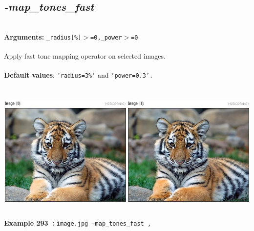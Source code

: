 \documentclass[a4paper,11pt,twoside]{book}
\begin{document}
\subsection{\emph{-map\_tones\_fast} }\vspace*{-0.5em}
~\\\textbf{Arguments: } 
{\small \texttt{\_radius[\%]$>$=0,\_power$>$=0}}\\~\\
Apply fast tone mapping operator on selected images.
~\\~\\\textbf{Default values}: {\small \texttt{'radius=3\%'} and \texttt{'power=0.3'.}}
\begin{center}\includegraphics[keepaspectratio=true,height=7cm,width=\textwidth]{img/gmic_def293.jpg}\\
{\footnotesize \textbf{Example 293~:} \texttt{image.jpg --map\_tones\_fast ,}}
\end{center}
\end{document}
